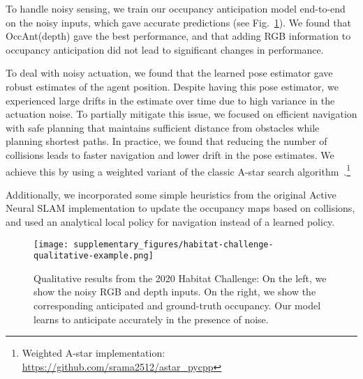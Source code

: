 \documentclass[runningheads]{llncs}
\begin{document}
To handle noisy sensing, we train our occupancy anticipation model end-to-end on the noisy inputs, which gave accurate predictions (see Fig.~\ref{fig:challenge_qualitative}). We found that OccAnt(depth) gave the best performance, and that adding RGB information to occupancy anticipation did not lead to significant changes in performance. 

To deal with noisy actuation, we found that the learned pose estimator gave robust estimates of the agent position. Despite having this pose estimator, we experienced large drifts in the estimate over time due to high variance in the actuation noise. To partially mitigate this issue, we focused on efficient navigation with safe planning that maintains sufficient distance from obstacles while planning shortest paths. In practice, we found that reducing the number of collisions leads to faster navigation and lower drift in the pose estimates. We achieve this by using a weighted variant of the classic A-star search algorithm~\cite{Hart1968}.\footnote{Weighted A-star implementation: \url{https://github.com/srama2512/astar_pycpp}}

Additionally, we incorporated some simple heuristics from the original Active Neural SLAM implementation to update the occupancy maps based on collisions, and used an analytical local policy for navigation instead of a learned policy.

\begin{figure}
    \centering
    \texttt{[image: supplementary\_figures/habitat-challenge-qualitative-example.png]}
    \caption{Qualitative results from the 2020 Habitat Challenge: On the left, we show the noisy RGB and depth inputs. On the right, we show the corresponding anticipated and ground-truth occupancy. Our model learns to anticipate accurately in the presence of noise.}
    \label{fig:challenge_qualitative}
\end{figure} 
\end{document}
